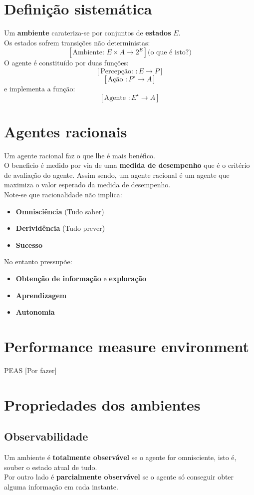 \documentclass[]{report}
\begin{document}
\section{Definição sistemática}
Um \textbf{ambiente} carateriza-se por conjuntos de \textbf{estados} $E$.\\
Os estados sofrem transições não deterministas:
$$[ \text{Ambiente: } E \times A \rightarrow 2^E] \text{(o que é isto?)}$$
O agente é constituído por duas funções:
$$[\text{Percepção: }: E \rightarrow P]$$
$$[\text{Ação }: P^{\star} \rightarrow A]$$
e implementa a função:
$$[\text{Agente }: E^\star \rightarrow A]$$
\section{Agentes racionais}
Um agente racional faz o que lhe é mais benéfico.\\
O beneficio é medido por via de uma \textbf{medida de desempenho} que é o critério de avaliação do agente.
Assim sendo, um agente racional é um agente que maximiza o valor esperado da medida de desempenho.\\
Note-se que racionalidade não implica:
\begin{itemize}
\item \textbf{Omnisciência} (Tudo saber)
\item \textbf{Derividência} (Tudo prever)
\item \textbf{Sucesso}
\end{itemize}
No entanto pressupõe:
\begin{itemize}
\item \textbf{Obtenção de informação} e \textbf{exploração}
\item \textbf{Aprendizagem}
\item \textbf{Autonomia}
\end{itemize}
\section{Performance measure environment}
PEAS
[Por fazer]
\clearpage
\section{Propriedades dos ambientes}
\subsection{Observabilidade}
Um ambiente é \textbf{totalmente observável} se o agente for omnisciente, isto é, souber o estado atual de tudo.\\
Por outro lado é \textbf{parcialmente observável} se o agente só conseguir obter alguma informação em cada instante.
\end{document}
